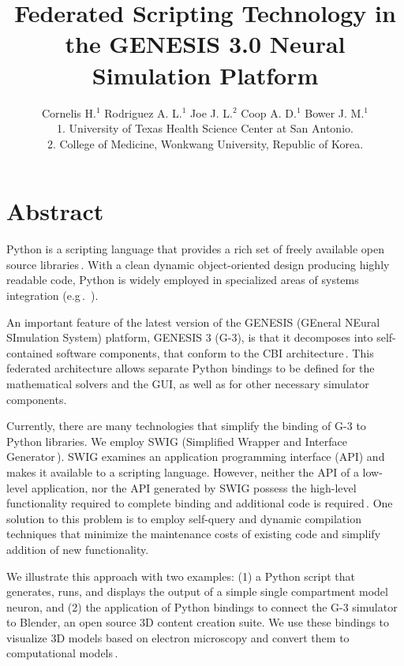 \documentclass[12pt]{article}
\begin{document}
\title{Federated Scripting Technology in the GENESIS 3.0 Neural
  Simulation Platform}

\author{Cornelis H.$^1$ Rodriguez A. L.$^1$ Joe J. L.$^2$ Coop A. D.$^1$ Bower J. M.$^1$\\
  {\small 1. University of Texas Health Science Center at San Antonio.} \\
  {\small 2. College of Medicine, Wonkwang University, Republic of Korea.}
}

\maketitle
{}
\section*{Abstract}
Python is a scripting language that provides a rich set of freely
available open source
libraries\,\cite{langtangen04:_python_scrip_comput_scien}. With a
clean dynamic object-oriented design producing highly readable code,
Python is widely employed in specialized areas of systems integration
(e.g\,.~\cite{thiruvathukal01:_web_progr_python}).

An important feature of the latest version of the GENESIS (GEneral
NEural SImulation System) platform, GENESIS 3 (G-3), is that it
decomposes into self-contained software components, that conform to the
CBI architecture\,\cite{cornelis08:_cbi_archit_comput_simul_realis}.
This federated architecture allows separate Python bindings to be
defined for the mathematical solvers and the GUI, as well as for other
necessary simulator components.

Currently, there are many technologies that simplify the binding of G-3
to Python libraries.  We employ SWIG (Simplified Wrapper and Interface
Generator\,\cite{08:_simpl_wrapp_inter_gener}).  SWIG examines an
application programming interface (API) and makes it available to a scripting language.
However, neither the API of a low-level application, nor the API
generated by SWIG possess the high-level functionality required to
complete binding and additional code is
required\,\cite{08:_swig_python}. One solution to this problem is to employ self-query and dynamic
compilation techniques that minimize the maintenance costs of existing code
and simplify addition of new functionality.

We illustrate this approach with two examples: (1) a Python script that
generates, runs, and displays the output of a simple single
compartment model neuron, and (2) the application of Python bindings
to connect the G-3 simulator to Blender, an open source 3D content
creation suite.  We use these bindings to visualize 3D models based on
electron microscopy and convert them to computational
models\,\cite{cornelis08:_model_neuros_genes}.
\end{document}
